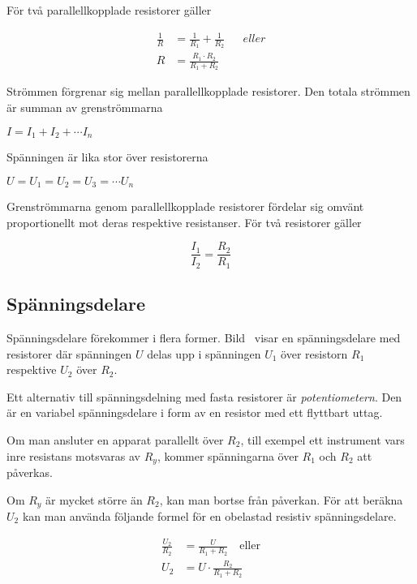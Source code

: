 För två parallellkopplade resistorer gäller

\begin{align*}
\frac{1}{R} &= \frac{1}{R_1} + \frac{1}{R_2} && eller \\
R &= \frac{R_1 \cdot R_2}{R_1 + R_2}
\end{align*}

Strömmen förgrenar sig mellan parallellkopplade resistorer.
Den totala strömmen är summan av grenströmmarna

\( I = I_1 + I_2 + \cdots I_n \)

Spänningen är lika stor över resistorerna

\(U = U_1 = U_2 = U_3 = \cdots U_n \)

Grenströmmarna genom parallellkopplade resistorer fördelar sig omvänt
proportionellt mot deras respektive resistanser.
För två resistorer gäller

\[\frac{I_1}{I_2} = \frac{R_2}{R_1}\]

\subsection{Spänningsdelare}
\label{spänningsdelare}


Spänningsdelare förekommer i flera former.
Bild~ visar en spänningsdelare med resistorer där
spänningen \(U\) delas upp i spänningen \(U_1\) över resistorn \(R_1\)
respektive \(U_2\) över \(R_2\).

Ett alternativ till spänningsdelning med fasta resistorer är \emph{potentiometern}. 
Den är en variabel spänningsdelare i form av en resistor med ett flyttbart uttag.

Om man ansluter en apparat parallellt över \(R_2\), till exempel ett instrument
vars inre resistans motsvaras av \(R_y\), kommer spänningarna över \(R_1\)
och \(R_2\) att påverkas.

Om \(R_y\) är mycket större än \(R_2\), kan man bortse från påverkan.
För att beräkna \(U_2\) kan man använda följande formel för en obelastad
resistiv spänningsdelare.

\begin{align*}
\frac{U_2}{R_2} &= \frac{U}{R_1 + R_2} \quad \text{eller} \\
U_2 &= U \cdot \frac{R_2}{R_1 + R_2}
\end{align*}

